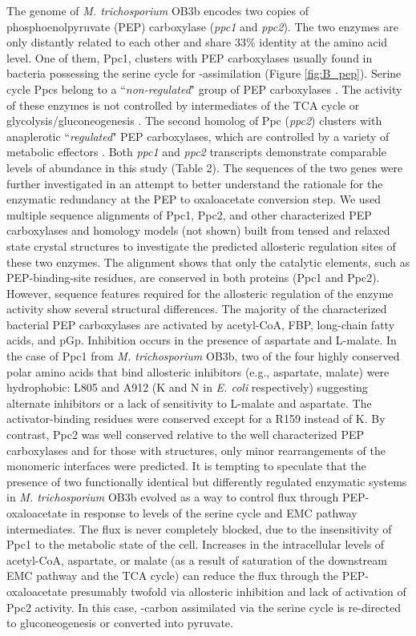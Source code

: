 The genome of \textit{M. trichosporium} OB3b encodes two copies of phosphoenolpyruvate (PEP) carboxylase (\textit{ppc1} and \textit{ppc2}).
The two enzymes are only distantly related to each other and share 33\% identity at the amino acid level.
One of them, Ppc1, clusters with PEP carboxylases usually found in bacteria possessing the serine cycle for -assimilation (Figure \ref{fig:B_pep}).
Serine cycle Ppcs belong to a ``\textit{non-regulated}" group of PEP carboxylases \cite{anthony1982}.
The activity of these enzymes is not controlled by intermediates of the TCA cycle or glycolysis/gluconeogenesis \cite{newaz1975}.
The second homolog of Ppc (\textit{ppc2}) clusters with anaplerotic ``\textit{regulated}" PEP carboxylases, which are controlled by a variety of metabolic effectors \cite{takahashi1993, kai2003}.
Both \textit{ppc1} and \textit{ppc2} transcripts demonstrate comparable levels of abundance in this study (Table 2).
The sequences of the two genes were further investigated in an attempt to better understand the rationale for the enzymatic redundancy at the PEP to oxaloacetate conversion step.
We used multiple sequence alignments of Ppc1, Ppc2, and other characterized PEP carboxylases and homology models (not shown) built from tensed and relaxed state crystal structures \cite{matsumura2002} to investigate the predicted allosteric regulation sites of these two enzymes.
The alignment shows that only the catalytic elements, such as PEP-binding-site residues, are conserved in both proteins (Ppc1 and Ppc2). %
However, sequence features required for the allosteric regulation of the enzyme activity show several structural differences.
The majority of the characterized bacterial PEP carboxylases are activated by acetyl-CoA, FBP, long-chain fatty acids, and pGp.
Inhibition occurs in the presence of aspartate and L-malate.
In the case of Ppc1 from \textit{M. trichosporium} OB3b, two of the four highly conserved polar amino acids that bind allosteric inhibitors (e.g., aspartate, malate) were hydrophobic: L805 and A912 (K and N in \textit{E. coli} respectively) suggesting alternate inhibitors or a lack of sensitivity to L-malate and aspartate.
The activator-binding residues were conserved except for a R159 instead of K.
By contrast, Ppc2 was well conserved relative to the well characterized PEP carboxylases and for those with structures, only minor rearrangements of the monomeric interfaces were predicted.
It is tempting to speculate that the presence of two functionally identical but differently regulated enzymatic systems in \textit{M. trichosporium} OB3b evolved as a way to control flux through PEP-oxaloacetate in response to levels of the serine cycle and EMC pathway intermediates.
The flux is never completely blocked, due to the insensitivity of Ppc1 to the metabolic state of the cell.
Increases in the intracellular levels of acetyl-CoA, aspartate, or malate (as a result of saturation of the downstream EMC pathway and the TCA cycle) can reduce the flux through the PEP-oxaloacetate presumably twofold via allosteric inhibition and lack of activation of Ppc2 activity.
In this case, -carbon assimilated via the serine cycle is re-directed to gluconeogenesis or converted into pyruvate.

